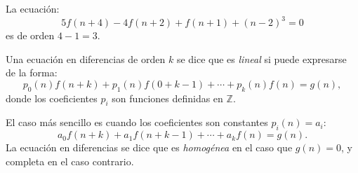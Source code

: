 \begin{example}{}
	La ecuación:
	\begin{equation}
		5f(n+4)-4f(n+2)+f(n+1)+(n-2)^{3}=0
	\end{equation}
	es de orden $4-1=3$.
\end{example}

Una ecuación en diferencias de orden $k$ se dice que es \emph{lineal} si puede expresarse de la forma:
\begin{equation*}
	p_{0}(n)f(n+k)+p_{1}(n)f(0+k-1)+\cdots+p_{k}(n)f(n)=g(n),
\end{equation*}
donde los coeficientes $p_{i}$ son funciones definidas en $\mathds{Z}$.

El caso más sencillo es cuando los coeficientes son constantes $p_{i}(n)=a_{i}$:
\begin{equation*}
	a_{0}f(n+k)+a_{1}f(n+k-1)+\cdots+a_{k}f(n)=g(n).
\end{equation*}
La ecuación en diferencias se dice que es \emph{homogénea} en el caso que $g(n)=0$, y completa en el caso contrario.